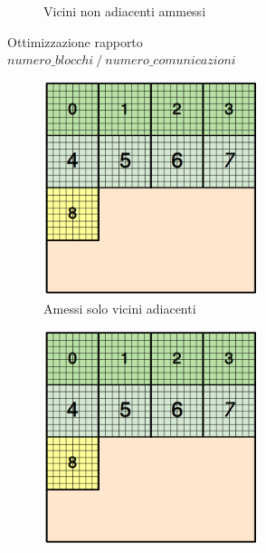 {\begin{figure}[H]
\begin{subfigure}{1.0\textwidth}
\begin{subfigure}{0.5\textwidth}
			Vicini non adiacenti ammessi
		\end{subfigure}
	\caption{Ottimizzazione rapporto $numero\_blocchi\mathbin{/}numero\_comunicazioni$\newline}
	\label{fig:nb_nb}
	\end{subfigure}
	\begin{subfigure}{1.0\textwidth}
	\centering
	\begin{subfigure}{0.5\textwidth}
		\centering
		\includegraphics[width=0.9\textwidth]{immagini/block_on_grid.png}
		Amessi solo vicini adiacenti
	\end{subfigure}%
	\begin{subfigure}{0.5\textwidth}
		\centering
		\includegraphics[width=0.9\textwidth]{immagini/block_on_grid.png}

\end{subfigure}
\end{subfigure}
\end{figure}}
